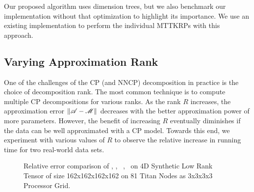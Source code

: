 Our proposed algorithm uses dimension trees, but we also benchmark our implementation without that optimization to highlight its importance.
We use an existing implementation to perform the individual MTTKRPs \cite{HBJT18} with this approach.

\subsection{Varying Approximation Rank}

One of the challenges of the CP (and NNCP) decomposition in practice is the choice of decomposition rank.
The most common technique is to compute multiple CP decompositions for various ranks.
As the rank $R$ increases, the approximation error  $\|\TA - \T{M}\|$ decreases with the better approximation power of more parameters. 
However, the benefit of increasing $R$ eventually diminishes if the data can be well approximated with a CP model.
Towards this end, we experiment with various values of $R$ to observe the relative increase in running time for two real-world data sets. 


\begin{figure}
\caption{Relative error comparison of \MU, \HALS, \BPP\, \ADMM, \Nestrov\ on 4D Synthetic Low Rank Tensor of size 162x162x162x162 on 81 Titan Nodes as 3x3x3x3 Processor Grid.}
\label{fig:convergencelowrank}
\end{figure}

